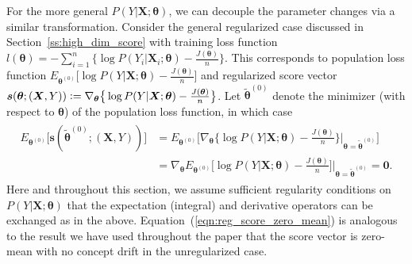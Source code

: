 \documentclass[twoside,11pt]{article}
\begin{document}
For the more general $P(Y|\bm{X};\bm{\theta})$, we can decouple the parameter changes via a similar transformation. Consider the general regularized case discussed in Section~\ref{ss:high_dim_score} with training loss function  $l(\bm{\theta}) = - \sum_{i=1}^n \big\{ \log{ P(Y_i|\bm{X}_i;\bm{\theta})} - \frac{J(\bm{\theta})}{n}\big\}$. This corresponds to population loss function $E _{\bm { \theta}^{ (0)}} \big[ \log{ P(Y|\bm{X};\bm{\theta})} - \frac{J(\bm{\theta})}{n}\big]$ and regularized score vector $\bm{s}(\bm{\theta};(\bm{X},Y)) \vcentcolon= \nabla_{\bm{\theta}} \big\{ \log{ P(Y|\bm{X};\bm{\theta})} -\frac{J(\bm{\theta})}{n} \big\}$. Let $\tilde{ \bm { \theta}} ^{ (0)}$ denote the minimizer (with respect to $\bm{\theta}$) of the population loss function, in which case
\begin{align}
\begin{aligned}
E _{\bm { \theta}^{ (0)}} \big[ \bm{s} (\tilde{ \bm { \theta}} ^{ (0)}; (\bm{X},Y) ) \big] &= E _{\bm { \theta}^{ (0)}} \big[ \nabla_{\bm{\theta}} \big\{ \log{ P(Y|\bm{X};\bm{\theta})} -\frac{J(\bm{\theta})}{n} \big\}|_{\bm{\theta} = \tilde{{\bm{\theta}}}^{(0)}} \big] \\
&= \nabla_{\bm{\theta}} E _{\bm { \theta}^{ (0)}} \big[ \log{P(Y|\bm{X};\bm{\theta})} -\frac{J(\bm{\theta})}{n} \big]\big|_{\bm{\theta} = \tilde{{\bm{\theta}}}^{(0)}} = \bm{0}. 
\end{aligned}
\label{eqn:reg_score_zero_mean}
\end{align}
Here and throughout this section, we assume sufficient regularity conditions on $P(Y|\bm{X};\bm{\theta})$ that the expectation (integral) and derivative operators can be exchanged as in the above. Equation~(\ref{eqn:reg_score_zero_mean}) is analogous to the result we have used throughout the paper that the score vector is zero-mean with no concept drift in the unregularized case.
\end{document}
